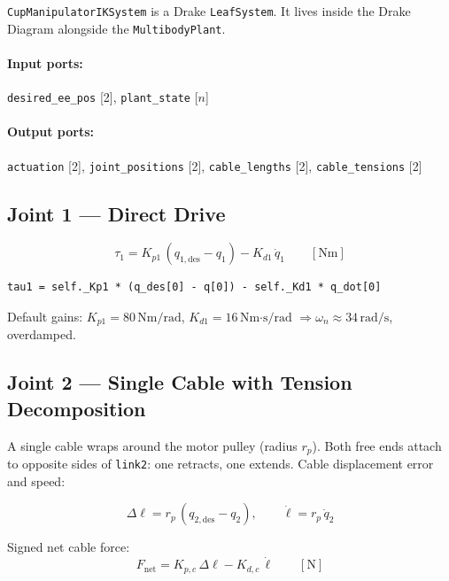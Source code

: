 \documentclass[11pt, a4paper]{article}
\begin{document}
\texttt{CupManipulatorIKSystem} is a Drake \texttt{LeafSystem}.
It lives inside the Drake Diagram alongside the \texttt{MultibodyPlant}.

\paragraph{Input ports:} \texttt{desired\_ee\_pos} [2], \texttt{plant\_state} [$n$]

\paragraph{Output ports:} \texttt{actuation} [2], \texttt{joint\_positions} [2],
\texttt{cable\_lengths} [2], \texttt{cable\_tensions} [2]

\subsection{Joint 1 — Direct Drive}

\begin{equation}
  \tau_1 = K_{p1}\,(q_{1,\text{des}} - q_1) - K_{d1}\,\dot{q}_1
  \qquad [\text{Nm}]
\end{equation}

\begin{lstlisting}
tau1 = self._Kp1 * (q_des[0] - q[0]) - self._Kd1 * q_dot[0]
\end{lstlisting}

Default gains: $K_{p1} = 80\,\text{Nm/rad}$, $K_{d1} = 16\,\text{Nm·s/rad}$
$\Rightarrow \omega_n \approx 34\,\text{rad/s}$, overdamped.

\subsection{Joint 2 — Single Cable with Tension Decomposition}

A single cable wraps around the motor pulley (radius $r_p$).
Both free ends attach to opposite sides of \texttt{link2}: one retracts,
one extends.  Cable displacement error and speed:

\begin{equation}
  \Delta\ell = r_p\,(q_{2,\text{des}} - q_2), \qquad
  \dot{\ell}  = r_p\,\dot{q}_2
\end{equation}

Signed net cable force:
\begin{equation}
  F_{\text{net}} = K_{p,c}\,\Delta\ell - K_{d,c}\,\dot{\ell}
  \qquad [\text{N}]
\end{equation}
\end{document}
